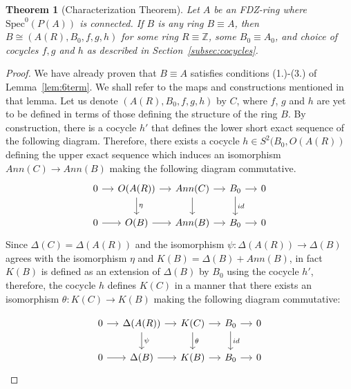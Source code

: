 \documentclass{article}
\newtheorem{theorem}{Theorem}[section]
\theoremstyle{remark}
\def\Z{{\mathbb{Z}}}
\begin{document}
\begin{theorem}[Characterization Theorem] Let $A$ be an FDZ-ring where $\text{Spec}^0(P(A))$ is connected. If $B$ is any ring $B\equiv A$, then
$B\cong (A(R),B_0, f,g,h)$
for some ring $R\equiv \Z$, some $B_0\equiv A_0$, and choice of cocycles $f,g$ and $h$ as described in Section~\ref{subsec:cocycles}.   
\end{theorem}
\begin{proof}
    We have already proven that $B\equiv A$ satisfies conditions (1.)-(3.) of  Lemma~\ref{lem:6term}. We shall refer to the maps and constructions mentioned in that lemma. Let us denote $(A(R),B_0,f,g,h)$ by $C$, where $f$, $g$ and $h$ are yet to be defined in terms of those defining the structure of the ring $B$. By construction, there is a cocycle $h'$ that defines the lower short exact sequence of the following diagram. Therefore, there exists a cocycle $h\in S^2(B_0, O(A(R))$ defining the upper exact sequence which induces an isomorphism $Ann(C)\to Ann(B)$ making the following diagram commutative.
$$\begin{tikzcd}[column sep=small]
0 \arrow[r] & O(A(R)) \arrow[r]  \arrow[d,"\eta"] &
Ann(C) \arrow[r] \arrow[d]&
B_0 \arrow[r]\arrow[d,"id"] &0\\
0 \arrow[r] & O(B) \arrow[r] &
Ann(B) \arrow[r]  &
B_0 \arrow[r]  & 0
\end{tikzcd}$$
Since $\Delta(C)=\Delta(A(R))$ and the isomorphism $\psi: \Delta(A(R))\to \Delta(B)$ agrees with the isomorphism $\eta$ and $K(B)=\Delta(B)+Ann(B)$, in fact $K(B)$ is defined as an extension of $\Delta(B)$ by $B_0$ using the cocycle $h'$, therefore, the cocycle $h$ defines $K(C)$ in a manner that there exists an isomorphism $\theta:K(C) \to K(B)$ making the following diagram commutative:

$$\begin{tikzcd}[column sep=small]
0 \arrow[r] & \Delta(A(R)) \arrow[r]  \arrow[d,"\psi"] &
K(C) \arrow[r] \arrow[d, "\theta"]&
B_0 \arrow[r]\arrow[d,"id"] &0\\
0 \arrow[r] & \Delta(B) \arrow[r] &
K(B) \arrow[r]  &
B_0 \arrow[r]  & 0
\end{tikzcd}$$


\end{proof}
\end{document}
